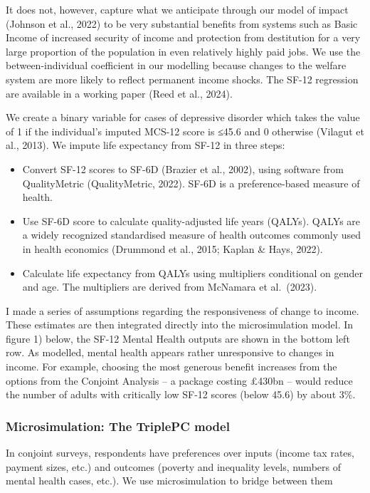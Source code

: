 \documentclass[
  letterpaper,
  DIV=11,
  numbers=noendperiod]{scrartcl}
\providecommand{\tightlist}{%
  \setlength{\itemsep}{0pt}\setlength{\parskip}{0pt}}\usepackage{longtable,booktabs,array}
\begin{document}
It does not, however, capture what we anticipate through our model of
impact (Johnson et al., 2022) to be very substantial benefits from
systems such as Basic Income of increased security of income and
protection from destitution for a very large proportion of the
population in even relatively highly paid jobs. We use the
between-individual coefficient in our modelling because changes to the
welfare system are more likely to reflect permanent income shocks. The
SF-12 regression are available in a working paper (Reed et al., 2024).

We create a binary variable for cases of depressive disorder which takes
the value of 1 if the individual's imputed MCS-12 score is ≤45.6 and 0
otherwise (Vilagut et al., 2013). We impute life expectancy from SF-12
in three steps:

\begin{itemize}
\tightlist
\item
  Convert SF-12 scores to SF-6D (Brazier et al., 2002), using software
  from QualityMetric (QualityMetric, 2022). SF-6D is a preference-based
  measure of health.
\item
  Use SF-6D score to calculate quality-adjusted life years (QALYs).
  QALYs are a widely recognized standardised measure of health outcomes
  commonly used in health economics (Drummond et al., 2015; Kaplan \&
  Hays, 2022).
\item
  Calculate life expectancy from QALYs using multipliers conditional on
  gender and age. The multipliers are derived from McNamara et
  al.~(2023).
\end{itemize}

I made a series of assumptions regarding the responsiveness of change to
income. These estimates are then integrated directly into the
microsimulation model. In figure 1) below, the SF-12 Mental Health
outputs are shown in the bottom left row. As modelled, mental health
appears rather unresponsive to changes in income. For example, choosing
the most generous benefit increases from the options from the Conjoint
Analysis -- a package costing £430bn -- would reduce the number of
adults with critically low SF-12 scores (below 45.6) by about 3\%.

\subsubsection{Microsimulation: The TriplePC
model}\label{microsimulation-the-triplepc-model}

In conjoint surveys, respondents have preferences over inputs (income
tax rates, payment sizes, etc.) and outcomes (poverty and inequality
levels, numbers of mental health cases, etc.). We use microsimulation to
bridge between them
\end{document}
